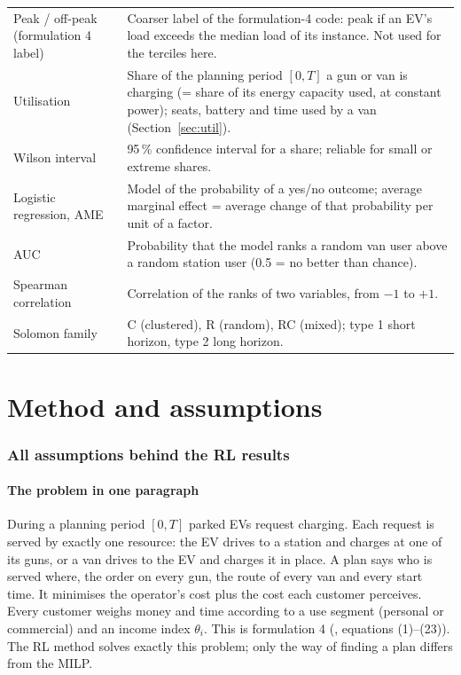 \begin{xltabular}{\textwidth}{@{}>{\raggedright\arraybackslash}p{4.0cm}X@{}}
Peak / off-peak (formulation 4 label) & Coarser label of the formulation-4 code: peak if an EV's load exceeds the median load of its instance. Not used for the terciles here. \\
Utilisation & Share of the planning period $[0,T]$ a gun or van is charging (= share of its energy capacity used, at constant power); seats, battery and time used by a van (Section~\ref{sec:util}). \\
Wilson interval & 95\,\% confidence interval for a share; reliable for small or extreme shares. \\
Logistic regression, AME & Model of the probability of a yes/no outcome; average marginal effect = average change of that probability per unit of a factor. \\
AUC & Probability that the model ranks a random van user above a random station user (0.5 = no better than chance). \\
Spearman correlation & Correlation of the ranks of two variables, from $-1$ to $+1$. \\
Solomon family & C (clustered), R (random), RC (mixed); type 1 short horizon, type 2 long horizon. \\
\bottomrule
\end{xltabular}

\clearpage
\part{Method and assumptions}

\section{All assumptions behind the RL results}
\label{sec:assumptions}

\subsection{The problem in one paragraph}
During a planning period $[0,T]$ parked EVs request charging. Each request is served by exactly one resource: the EV drives to a station and charges at one of its guns, or a van drives to the EV and charges it in place. A plan says who is served where, the order on every gun, the route of every van and every start time. It minimises the operator's cost plus the cost each customer perceives. Every customer weighs money and time according to a use segment (personal or commercial) and an income index $\theta_i$. This is formulation 4 (, equations (1)--(23)). The RL method solves exactly this problem; only the way of finding a plan differs from the MILP.

